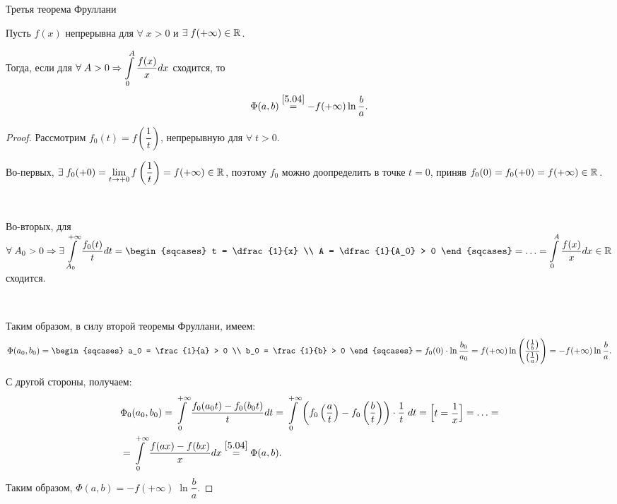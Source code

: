 \begin{col-answer-preambule}
\end{col-answer-preambule}

\begin{statementDotted}{Третья теорема Фруллани}$  $
	
	Пусть $ f(x) $ непрерывна для $ \forall \; x > 0 $ и $\exists \; f(+\infty) \in \mathbb{R}^{}$.
	
	Тогда, если для  $\forall \; A > 0 \Rightarrow \displaystyle\int\limits_0^A \dfrac{f(x)}{x} dx $ сходится, то
	\begin{equation}
	\label{5.08}
	\Phi (a, b) \overset{\eqref{5.04}}{=} - f(+\infty) \ln \frac{b}{a}.
	\end{equation}
\end{statementDotted}
\begin{proof}
	Рассмотрим $ f_0(t) = f\left(\dfrac{1}{t}\right)  $, непрерывную для $ \forall \; t > 0 $. 
	
	Во-первых,  
	$ \exists \; f_0(+0) = \lim\limits_{t \to +0} f \left(\dfrac{1}{t}\right) = f (+\infty ) \in \mathbb{R}^{}$, 
	поэтому $ f_0 $ можно доопределить в точке $ t = 0 $, приняв 
	$ f_0(0) = f_0(+0) = f(+\infty) \in \mathbb{R}^{} $.
	
	$  $
	
	Во-вторых, для 
	$ \forall \; A_0 > 0 \Rightarrow \exists \dintl_{A_0}^{+\infty} \dfrac{f_0(t)}{t} dt =
	\begin{sqcases}
	t = \dfrac{1}{x} \\
	A = \dfrac{1}{A_0} > 0
	\end{sqcases}
	= \ldots =
	\dintl_0^A \dfrac{f(x)}{x} dx \in \R{} $
	сходится.
	
	$  $
	
	Таким образом, в силу второй теоремы Фруллани, имеем:
	\begin{equation*}
	\Phi (a_0, b_0)
	= \begin{sqcases}
	a_0 = \frac{1}{a} > 0 \\ 
	b_0 = \frac{1}{b} > 0 
	\end{sqcases}
	= f_0 (0) \cdot \ln \dfrac{b_0}{a_0}
	= f(+\infty) \ln \left(\dfrac{\parenthesis{\frac{1}{b}}}{\parenthesis{\frac{1}{a}}}\right)
	= - f(+\infty) \ln \frac{b}{a}.
	\end{equation*}
	
	С другой стороны, получаем:
	\begin{align*}
	& \Phi_0 (a_0, b_0) 
	= \displaystyle\int\limits_0^{+\infty} \dfrac{f_0(a_0 t)-f_0(b_0 t)}{t} dt
	= \displaystyle\int\limits_0^{+ \infty} \left(f_0 \left(\dfrac{a}{t} \right) - f_0 \left(\dfrac{b}{t} \right) \right) \cdot \dfrac{1}{t} \; dt = \left[\begin{matrix} t = \dfrac{1}{x} \end{matrix}\right] 
	= \ldots
	= \\ &
	= \displaystyle\int\limits_0^{+\infty} \dfrac{f(ax)-f(bx)}{x} dx
	\overset{\eqref{5.04}}{=} \Phi (a, b).
	\end{align*}
	Таким образом, $ \Phi (a, b) = - f(+\infty) \; \ln \dfrac{b}{a}. $
\end{proof}